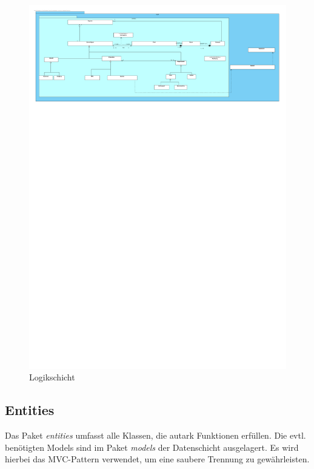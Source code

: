 \begin{figure}[h]
	\begin{center}
		\includegraphics[trim=0cm 43cm 0cm 0cm, clip=true, width=16cm]{kapitel/bausteinsicht/logik.pdf}
	\end{center}
	\caption{Logikschicht}
	\label{fig:logik_uml}
\end{figure}

\subsection{Entities}
Das Paket \textit{entities} umfasst alle Klassen, die autark Funktionen erfüllen. Die evtl. 
benötigten Models sind im Paket \textit{models} der Datenschicht ausgelagert. Es wird hierbei das 
MVC-Pattern verwendet, um eine saubere Trennung zu gewährleisten.

